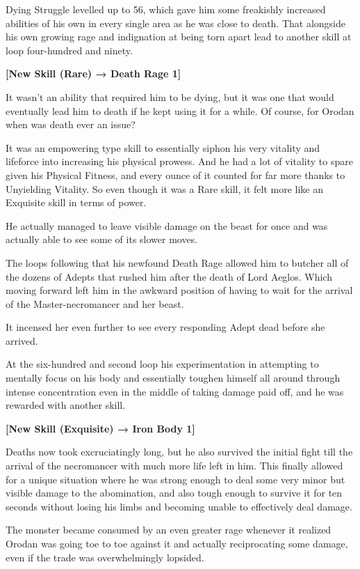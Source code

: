 \documentclass[a4paper,10pt]{book}
\begin{document}
Dying Struggle levelled up to 56, which gave him some freakishly increased abilities of his own in every single area as he was close to death. That alongside his own growing rage and indignation at being torn apart lead to another skill at loop four-hundred and ninety.\par
\textbf{[New Skill (Rare) → Death Rage 1]}\par
It wasn’t an ability that required him to be dying, but it was one that would eventually lead him to death if he kept using it for a while. Of course, for Orodan when was death ever an issue?\par
It was an empowering type skill to essentially siphon his very vitality and lifeforce into increasing his physical prowess. And he had a lot of vitality to spare given his Physical Fitness, and every ounce of it counted for far more thanks to Unyielding Vitality. So even though it was a Rare skill, it felt more like an Exquisite skill in terms of power.\par
He actually managed to leave visible damage on the beast for once and was actually able to see some of its slower moves.\par
The loops following that his newfound Death Rage allowed him to butcher all of the dozens of Adepts that rushed him after the death of Lord Aeglos. Which moving forward left him in the awkward position of having to wait for the arrival of the Master-necromancer and her beast.\par
It incensed her even further to see every responding Adept dead before she arrived.\par
At the six-hundred and second loop his experimentation in attempting to mentally focus on his body and essentially toughen himself all around through intense concentration even in the middle of taking damage paid off, and he was rewarded with another skill.\par
\textbf{[New Skill (Exquisite) → Iron Body 1]}\par
Deaths now took excruciatingly long, but he also survived the initial fight till the arrival of the necromancer with much more life left in him. This finally allowed for a unique situation where he was strong enough to deal some very minor but visible damage to the abomination, and also tough enough to survive it for ten seconds without losing his limbs and becoming unable to effectively deal damage.\par
The monster became consumed by an even greater rage whenever it realized Orodan was going toe to toe against it and actually reciprocating some damage, even if the trade was overwhelmingly lopsided.\par
\end{document}
